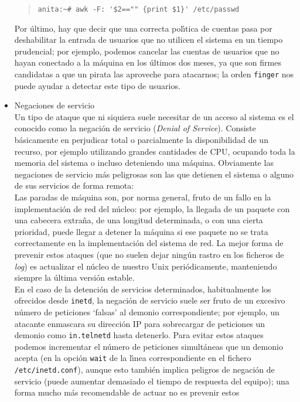 \begin{itemize}
\begin{quote}
\begin{verbatim}
anita:~# awk -F: '$2=="" {print $1}' /etc/passwd
\end{verbatim}
\end{quote}
\rm
Por \'ultimo, hay que decir que una correcta pol\'{\i}tica de cuentas pasa por
deshabilitar la entrada de usuarios que no utilicen el sistema en un tiempo
prudencial; por ejemplo, podemos cancelar las cuentas de usuarios que no 
hayan conectado a la m\'aquina en los \'ultimos dos meses, ya que son firmes
candidatas a que un pirata las aproveche para atacarnos; la orden {\tt finger}
nos puede ayudar a detectar este tipo de usuarios.
\item Negaciones de servicio\\
Un tipo de ataque que ni siquiera suele necesitar de un acceso al sistema es el
conocido como la negaci\'on de servicio ({\it Denial of Service}). Consiste 
b\'asicamente en perjudicar total o parcialmente la disponibilidad de un 
recurso, por ejemplo utilizando grandes cantidades de CPU, ocupando toda la 
memoria del sistema o incluso deteniendo una m\'aquina. Obviamente las 
negaciones de servicio m\'as peligrosas son las que detienen el sistema o 
alguno de sus servicios de forma remota:\\
Las paradas de m\'aquina
son, por norma general, fruto de un fallo en la implementaci\'on de red del 
n\'ucleo: por ejemplo, la llegada de un paquete con una cabecera extra\~na, de
una longitud determinada, o con una cierta prioridad, puede llegar a detener la
m\'aquina si ese paquete no se trata correctamente en la implementaci\'on del
sistema de red. La mejor forma de prevenir estos ataques (que no suelen dejar
ning\'un rastro en los ficheros de {\it log}) es actualizar el n\'ucleo de 
nuestro Unix peri\'odicamente, manteniendo siempre la \'ultima versi\'on 
estable.\\
En el caso de la detenci\'on de servicios determinados, habitualmente los 
ofrecidos desde {\tt inetd}, la negaci\'on de servicio suele ser fruto de un 
excesivo n\'umero de peticiones `falsas' al demonio correspondiente; por 
ejemplo, un atacante enmascara su direcci\'on IP para sobrecargar de peticiones
un demonio como {\tt in.telnetd} hasta detenerlo. Para evitar estos ataques 
podemos incrementar el n\'umero de peticiones simult\'aneas que un demonio 
acepta (en la opci\'on {\tt wait} de la l\'{\i}nea correspondiente en el 
fichero {\tt /etc/inetd.conf}), aunque esto tambi\'en implica peligros de 
negaci\'on de servicio (puede aumentar demasiado el tiempo de respuesta del
equipo); una forma mucho m\'as recomendable de actuar no es prevenir estos 

\end{itemize}
